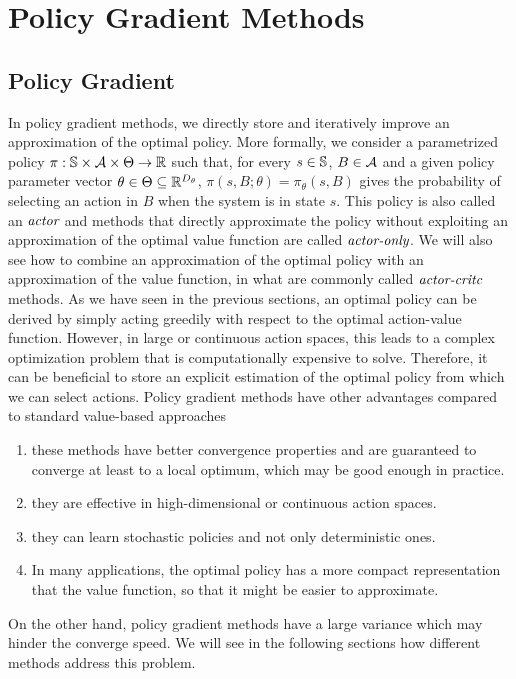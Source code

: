 \chapter{Policy Gradient Methods}

\section{Policy Gradient}
In policy gradient methods, we directly store and iteratively improve an 
approximation of the optimal policy. More formally, we consider a parametrized
policy $\pi: \S \times \calA \times \Theta \to \R$ such that, for every $s \in
\S$, $B \in \calA$ and a given policy parameter vector $\theta \in \Theta
\subseteq \R^{D_\theta}$, $\pi(s, B; \theta) = \pi_\theta(s, B)$ gives the
probability of selecting an action in $B$ when the system is in state $s$. This
policy is also called an $\emph{actor}$ and methods that directly approximate
the policy without exploiting an approximation of the optimal value function are 
called $\emph{actor-only}$. We will also see how to combine an approximation of 
the optimal policy with an approximation of the value function, in what are
commonly called $\emph{actor-critc}$ methods. As we have seen in the previous
sections, an optimal policy can be derived by simply acting greedily with
respect to the optimal action-value function. However, in large or continuous 
action spaces, this leads to a complex optimization problem that is 
computationally expensive to solve. Therefore, it can be beneficial to store an
explicit estimation of the optimal policy from which we can select actions.
Policy gradient methods have other advantages compared to standard value-based
approaches
\begin{enumerate}[label={\roman*)}]
	\item these methods have better convergence properties and are guaranteed
		to converge at least to a local optimum, which may be good enough in
		practice.  
	\item they are effective in high-dimensional or continuous action spaces.
	\item they can learn stochastic policies and not only deterministic ones.
	\item In many applications, the optimal policy has a more compact
		representation that the value function, so that it might be easier to
		approximate. 
\end{enumerate}
On the other hand, policy gradient methods have a large variance which may
hinder the converge speed. We will see in the following sections how different 
methods address this problem.  

